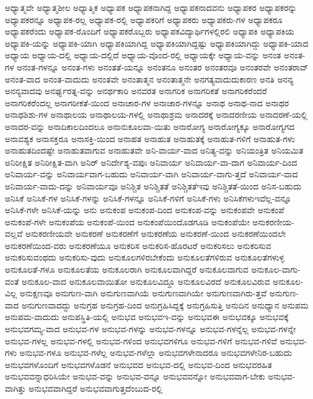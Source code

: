 {ಅಧ್ಯಾತ್ಮವೇ
ಅಧ್ಯಾತ್ಮಶೀಲ
ಅಧ್ಯಾತ್ಮಿಕ
ಅಧ್ಯಾಪಕ
ಅಧ್ಯಾಪಕನಾಗಿದ್ದ
ಅಧ್ಯಾಪಕನಾದವನು
ಅಧ್ಯಾಪಕರ
ಅಧ್ಯಾಪಕರನ್ನು
ಅಧ್ಯಾಪಕರನ್ನೂ
ಅಧ್ಯಾಪಕ-ರಲ್ಲ
ಅಧ್ಯಾಪಕ-ರಲ್ಲಿ
ಅಧ್ಯಾಪಕರಿಗೆ
ಅಧ್ಯಾಪಕರು
ಅಧ್ಯಾಪಕರು-ಗಳ
ಅಧ್ಯಾಪಕರೂ
ಅಧ್ಯಾಪಕರೆಂದು
ಅಧ್ಯಾಪಕ-ರೊಂದಿಗೆ
ಅಧ್ಯಾಪಕರೊಬ್ಬರು
ಅಧ್ಯಾಪಕವಿದ್ಯಾರ್ಥಿಗಳಲ್ಲಿರಲಿ
ಅಧ್ಯಾಪಕಿ
ಅಧ್ಯಾಪಕಿಯ
ಅಧ್ಯಾಪಕಿ-ಯನ್ನು
ಅಧ್ಯಾಪಕಿ-ಯಾಗಿ
ಅಧ್ಯಾಪಕಿಯಾಗಿದ್ದ
ಅಧ್ಯಾಪಕಿಯಾಗಿದ್ದಷ್ಟು
ಅಧ್ಯಾಪಕಿಯಾಗಿದ್ದು
ಅಧ್ಯಾಪಕಿ-ಯಾದ
ಅಧ್ಯಾಯ
ಅಧ್ಯಾಯ-ದಲ್ಲಿ
ಅಧ್ಯಾಯ-ದಲ್ಲಿದೆ
ಅಧ್ಯಾಯ-ವೊಂದ-ರಲ್ಲಿ
ಅಧ್ಯಾಯಕ್ಕೇ
ಅಧ್ಯಾಯ-ವನ್ನು
ಅನಂತ
ಅನಂತ-ಗಳ
ಅನಂತ-ಗಳನ್ನೂ
ಅನಂತ-ಗಳು
ಅನಂತತೆ-ಯನ್ನೂ
ಅನಂತನೂ
ಅನಂತರ
ಅನಂತರವೂ
ಅನಂತರವೇ
ಅನಂತರಾವ್
ಅನಂತ-ವಾದ
ಅನಂತ-ವಾದುದು
ಅನಂತವೇ
ಅನಂತಾತ್ಮನ
ಅನಂತಾತ್ಮನೇ
ಅನಗತ್ಯವಾದುದುಕಾರಣ
ಅನತಿ
ಅನನ್ಯ
ಅನನ್ಯವಾದವು
ಅನರ್ಘ್ಯರತ್ನ-ವನ್ನು
ಅನರ್ಥಕಾರಿ
ಅನವರತ
ಅನಾಗರಿಕ
ಅನಾಗರಿಕತೆ
ಅನಾಗರಿಕರೆಂದರೆ
ಅನಾಗರಿಕರೆಂದಲ್ಲ
ಅನಾಗರೀಕತೆ-ಯಿಂದ
ಅನಾಚಾರ-ಗಳ
ಅನಾಚಾರ-ಗಳನ್ನೂ
ಅನಾಥ
ಅನಾಥ-ನಾದ
ಅನಾಥರ
ಅನಾಥಶಿಶು-ಗಳ
ಅನಾಥಾಲಯ
ಅನಾಥಾಲಯ-ಗಳಲ್ಲಿ
ಅನಾಥಾಶ್ರಮ
ಅನಾದರಕ್ಕೆ
ಅನಾದರಣೀಯ
ಅನಾದರಣೆ-ಯಲ್ಲಿ
ಅನಾದರ-ವನ್ನು
ಅನಾದಿಕಾಲದಿಂದಲೂ
ಅನಾನುಕೂಲವಾ-ಯಿತು
ಅನಾರೋಗ್ಯ
ಅನಾರೋಗ್ಯಕ್ಕೂ
ಅನಾರೋಗ್ಯಗದ
ಅನಾವಶ್ಯಕ
ಅನಾಸಕ್ತರೂ
ಅನಾಸಕ್ತಿ-ಯಿಂದ
ಅನಾಹತ
ಅನಾಹುತ
ಅನಾಹುತಕ್ಕೆ
ಅನಾಹುತ-ಗಳಿಗೆ
ಅನಾಹುತ-ಗಳು
ಅನಾಹುತದಿಂದಷ್ಟೇ
ಅನಾಹುತವಾಗುವ
ಅನಾಹುತವೇ
ಅನಿ-ವಾರ್ಯ-ವಾದ
ಅನಿತ್ಯ-ವನ್ನು
ಅನಿಯಂತ್ರಿತ
ಅನಿಯಮಿತ
ಅನಿರೀಕ್ಷಿತ
ಅನಿರೀಕ್ಷಿತ-ವಾಗಿ
ಅನಿರ್
ಅನಿರ್ದೇಶ್ಯ-ವಪುಃ
ಅನಿವಾರ್ಯ
ಅನಿವಾರ್ಯ-ವಾ-ದಾಗ
ಅನಿವಾರ್ಯ-ದಿಂದ
ಅನಿವಾರ್ಯ-ವನ್ನು
ಅನಿವಾರ್ಯವಾಗ-ಬಹುದು
ಅನಿವಾರ್ಯ-ವಾಗಿ
ಅನಿವಾರ್ಯ-ವಾಗು-ತ್ತದೆ
ಅನಿವಾರ್ಯ-ವಾದ
ಅನಿವಾರ್ಯ-ವಾದು-ದನ್ನು
ಅನಿವಾರ್ಯವೂ
ಅನಿಶ್ಚಿತ
ಅನಿಶ್ಚಿತತೆ
ಅನಿಶ್ಚಿತತೆಇವು
ಅನಿಶ್ಚಿತತೆ-ಯಿಂದ
ಅನಿಸ-ಬಹುದು
ಅನಿಸಿಕೆ
ಅನಿಸಿಕೆ-ಗಳ
ಅನಿಸಿಕೆ-ಗಳನ್ನು
ಅನಿಸಿಕೆ-ಗಳನ್ನೂ
ಅನಿಸಿಕೆ-ಗಳಿಗೆ
ಅನಿಸಿಕೆ-ಗಳು
ಅನಿಸಿಕೆಗಳುಇವೆಲ್ಲ-ವನ್ನೂ
ಅನಿಸಿಕೆ-ಗಳೇ
ಅನಿಸಿಕೆ-ಯನ್ನು
ಅನು
ಅನುಕಂಪ
ಅನುಕಂಪ-ದಿಂದ
ಅನುಕಂಪ-ವನ್ನು
ಅನುಕಂಪವೇ
ಅನುಕಂಪೆ
ಅನುಕಂಪೆ-ಗಳೇ
ಅನುಕಂಪೆಯ
ಅನುಕಂಪೆ-ಯಿಂದ
ಅನುಕಂಪೆಯಿಂದೊಡಗೂಡಿ
ಅನುಕಂಪೆಯೇ
ಅನುಕರಣೀಯ-ವಲ್ಲವೆ
ಅನುಕರಣೀಯವೇ
ಅನುಕರಣೆ
ಅನುಕರಣೆಗೆ
ಅನುಕರಣೆಯ
ಅನುಕರಣೆ-ಯಿಂದ
ಅನುಕರಣೆಯಿಂದಲೇ
ಅನುಕರಣೆಯಿಂದ-ವರು
ಅನುಕರಣೆಯೂ
ಅನುಕರಿಸ
ಅನುಕರಿಸ-ಹೊರಟರೆ
ಅನುಕರಿಸಲು
ಅನುಕರಿಸುವ
ಅನುಕರಿಸುವಂಥದು
ಅನುಕರಿಸು-ವುದು
ಅನುಕೂಲಗಳಿರಬೇಕೆಂದು
ಅನುಕೂಲತೆಗಳಿರುವ
ಅನುಕೂಲತೆಗಳುಳ್ಳ
ಅನುಕೂಲತೆ-ಗಳೂ
ಅನುಕೂಲತೆಯ
ಅನುಕೂಲರಾಗಿ
ಅನುಕೂಲವಾಗಿದ್ದರೆ
ಅನುಕೂಲವಾಗುವ
ಅನುಕೂಲ-ವಾಗು-ವಂತೆ
ಅನುಕೂಲ-ವಾದ
ಅನುಕೂಲವಾಯಿತೋ
ಅನುಕೂಲವಿದ್ದೂ
ಅನುಕೂಲವಿರದೆ
ಅನುಕೂಲವಿರುವ
ಅನುಕೂಲ-ವಿಲ್ಲ
ಅನುಕ್ಷಣವೂ
ಅನುಗುಣ-ವಾಗಿ
ಅನುಗುಣವಾಗಿಯೆ
ಅನುಗುಣವಾಗಿಯೇ
ಅನುಗುಣವಾಗಿರು-ತ್ತವೆ
ಅನುಗುಣ-ವಾದ
ಅನುಗುಣವಾದದ್ದು
ಅನುಗ್ರಹ
ಅನುಗ್ರಹ-ದಿಂದ
ಅನುಗ್ರಹಿಸಿದ್ದಕ್ಕೆ
ಅನುಗ್ರಹಿಸುತ್ತಿ
ಅನುದಿನ
ಅನುಧ್ಯಾನ
ಅನುಪಮ
ಅನುಪಮ-ವಾದುದು
ಅನುಪಸ್ಥಿತಿ-ಯಲ್ಲಿ
ಅನುಭವ
ಅನುಭವಇ-ವನ್ನು
ಅನುಭವಈ
ಅನುಭವಕ್ಕೂ
ಅನುಭವಕ್ಕೆ
ಅನುಭವಗಮ್ಯ-ವಾದ
ಅನುಭವ-ಗಳ
ಅನುಭವ-ಗಳನ್ನು
ಅನುಭವ-ಗಳನ್ನೂ
ಅನುಭವ-ಗಳನ್ನೆಲ್ಲ
ಅನುಭವ-ಗಳನ್ನೇ
ಅನುಭವ-ಗಳಲ್ಲ
ಅನುಭವ-ಗಳಲ್ಲಿ
ಅನುಭವ-ಗಳಿಂದ
ಅನುಭವಗಳಿಗೂ
ಅನುಭವ-ಗಳಿಗೆ
ಅನುಭವ-ಗಳಿವೆ
ಅನುಭವ-ಗಳು
ಅನುಭವ-ಗಳೂ
ಅನುಭವ-ಗಳೆಲ್ಲ
ಅನುಭವ-ಗಳೆಲ್ಲಾ
ಅನುಭವಗಳೇನಾದರೂ
ಅನುಭವಗಳೇನಿರ-ಬಹುದು
ಅನುಭವಗಳೊಂದಿಗೆ
ಅನುಭವಗಳೊಡನೆ
ಅನುಭವದ
ಅನುಭವ-ದಲ್ಲಿ
ಅನುಭವ-ದಿಂದ
ಅನುಭವರಹಿತ
ಅನುಭವವನ್ನಾಧರಿಸಿಯೇ
ಅನುಭವ-ವನ್ನು
ಅನುಭವ-ವನ್ನೂ
ಅನುಭವವನ್ನೋ
ಅನುಭವವಾಗ-ಬೇಕು
ಅನುಭವ-ವಾಗಿತ್ತು
ಅನುಭವವಾಗಿದ್ದರೆ
ಅನುಭವವಾಗುತ್ತದೆಂಬುದ-ರಲ್ಲಿ
}
